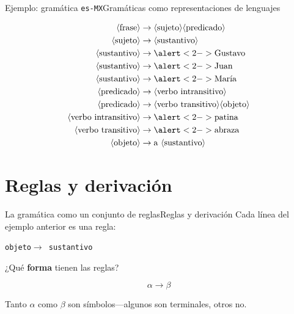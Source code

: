 \documentclass[spanish, handout]{beamer}
\begin{document}
\begin{frame}{Ejemplo: gramática \texttt{es-MX}}{Gramáticas como representaciones de lenguajes}

    \begin{align*}
        \langle \text{frase} \rangle & \to \langle \text{sujeto} \rangle \langle \text{predicado} \rangle\\
        \langle \text{sujeto} \rangle & \to \langle \text{sustantivo} \rangle\\
        \langle \text{sustantivo} \rangle & \to \alert<2->{\text{Gustavo}}\\
        \langle \text{sustantivo} \rangle & \to \alert<2->{\text{Juan}}\\
        \langle \text{sustantivo} \rangle & \to \alert<2->{\text{María}}\\
        \langle \text{predicado} \rangle & \to \langle \text{verbo intransitivo} \rangle\\
        \langle \text{predicado} \rangle & \to \langle \text{verbo transitivo} \rangle \langle \text{objeto}\rangle\\
        \langle \text{verbo intransitivo} \rangle & \to \alert<2->{\text{patina}}\\
        \langle \text{verbo transitivo} \rangle & \to \alert<2->{\text{abraza}}\\
        \langle \text{objeto} \rangle & \to \text{a } \langle \text{sustantivo} \rangle
    \end{align*}


\end{frame}

\section{Reglas y derivación}

\begin{frame}{La gramática como un conjunto de reglas}{Reglas y derivación}
    Cada línea del ejemplo anterior es una \alert{regla}:
    
    \bigskip

    \begin{center}
        {\large \texttt{\textlangle objeto\textrangle \quad $\to$ \quad \textlangle sustantivo\textrangle}}
    \end{center}  \pause
    
    \bigskip

    ¿Qué \textbf{forma} tienen las reglas? \pause
    
    \[\alpha \to \beta\] \pause

    Tanto $\alpha$ como $\beta$ son símbolos---algunos son terminales, otros no.

\end{frame}
\end{document}

